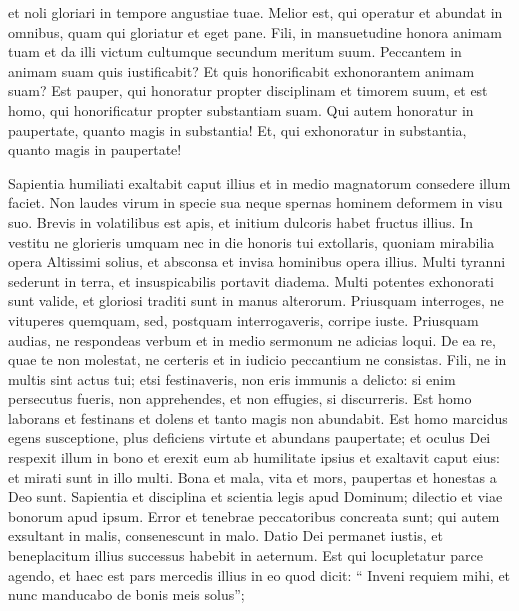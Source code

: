 \begin{biblechapter}
\begin{biblechapter}
\begin{biblechapter}
\begin{biblechapter}
\begin{biblechapter}
\begin{biblechapter}
\begin{biblechapter}
\begin{biblechapter}
\begin{biblechapter}
\begin{biblechapter}
 et noli gloriari in tempore angustiae tuae.
 \verse Melior est, qui operatur et abundat in omnibus,
 quam qui gloriatur et eget pane.
 \verse Fili, in mansuetudine honora animam tuam
 et da illi victum cultumque secundum meritum suum.
 \verse Peccantem in animam suam quis iustificabit?
 Et quis honorificabit exhonorantem animam suam?
 \verse Est pauper, qui honoratur propter disciplinam et timorem suum,
 et est homo, qui honorificatur propter substantiam suam.
 \verse Qui autem honoratur in paupertate, quanto magis in substantia!
 Et, qui exhonoratur in substantia, quanto magis in paupertate!
 
\begin{biblechapter}
\verse Sapientia humiliati exaltabit caput illius
 et in medio magnatorum consedere illum faciet.
 \verse Non laudes virum in specie sua
 neque spernas hominem deformem in visu suo.
 \verse Brevis in volatilibus est apis,
 et initium dulcoris habet fructus illius.
 \verse In vestitu ne glorieris umquam
 nec in die honoris tui extollaris,
 quoniam mirabilia opera Altissimi solius,
 et absconsa et invisa hominibus opera illius.
 \verse Multi tyranni sederunt in terra,
 et insuspicabilis portavit diadema.
 \verse Multi potentes exhonorati sunt valide,
 et gloriosi traditi sunt in manus alterorum.
 \verse Priusquam interroges, ne vituperes quemquam,
 sed, postquam interrogaveris, corripe iuste.
 \verse Priusquam audias, ne respondeas verbum
 et in medio sermonum ne adicias loqui.
 \verse De ea re, quae te non molestat, ne certeris
 et in iudicio peccantium ne consistas.
 \verse Fili, ne in multis sint actus tui;
 etsi festinaveris, non eris immunis a delicto:
 si enim persecutus fueris, non apprehendes,
 et non effugies, si discurreris.
 \verse Est homo laborans et festinans et dolens
 et tanto magis non abundabit.
 \verse Est homo marcidus egens susceptione,
 plus deficiens virtute et abundans paupertate;
 \verse et oculus Dei respexit illum in bono
 et erexit eum ab humilitate ipsius
 et exaltavit caput eius:
 et mirati sunt in illo multi.
 \verse Bona et mala, vita et mors,
 paupertas et honestas a Deo sunt.
 \verse Sapientia et disciplina et scientia legis apud Dominum;
 dilectio et viae bonorum apud ipsum.
 \verse Error et tenebrae peccatoribus concreata sunt;
 qui autem exsultant in malis, consenescunt in malo.
 \verse Datio Dei permanet iustis,
 et beneplacitum illius successus habebit in aeternum.
 \verse Est qui locupletatur parce agendo,
 et haec est pars mercedis illius
 \verse in eo quod dicit: “ Inveni requiem mihi,
 et nunc manducabo de bonis meis solus”;

\end{biblechapter}
\end{biblechapter}
\end{biblechapter}
\end{biblechapter}
\end{biblechapter}
\end{biblechapter}
\end{biblechapter}
\end{biblechapter}
\end{biblechapter}
\end{biblechapter}
\end{biblechapter}
